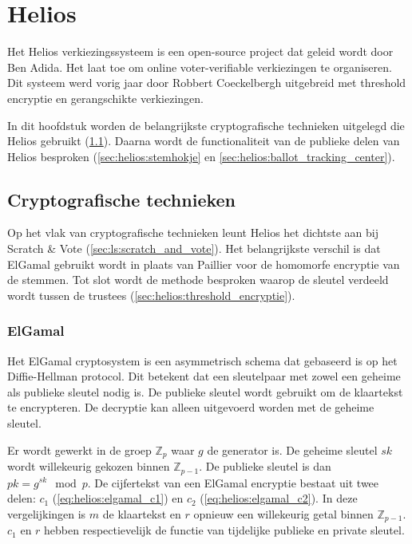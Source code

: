 % 
%

\chapter{Helios}
\label{chap:helios}

Het Helios verkiezingssysteem is een open-source project dat geleid wordt door Ben Adida.\cite{adida_helios} Het laat toe om online voter-verifiable verkiezingen te organiseren. Dit systeem werd vorig jaar door Robbert Coeckelbergh uitgebreid met threshold encryptie en gerangschikte verkiezingen.\cite{coeckelbergh_toepassing_en_uitbreiding_van_het_helios_online_verkiezingssysteem} 

\npar In dit hoofdstuk worden de belangrijkste cryptografische technieken uitgelegd die Helios gebruikt (\ref{sec:helios:cryptografische_technieken}). Daarna wordt de functionaliteit van de publieke delen van Helios besproken (\ref{sec:helios:stemhokje} en \ref{sec:helios:ballot_tracking_center}).

\section{Cryptografische technieken}
\label{sec:helios:cryptografische_technieken}

Op het vlak van cryptografische technieken leunt Helios het dichtste aan bij Scratch \& Vote (\ref{sec:ls:scratch_and_vote}). Het belangrijkste verschil is dat ElGamal gebruikt wordt in plaats van Paillier voor de homomorfe encryptie van de stemmen. Tot slot wordt de methode besproken waarop de sleutel verdeeld wordt tussen de trustees (\ref{sec:helios:threshold_encryptie}).

\subsection{ElGamal~\cite{elgamal_elgamal}}
\label{sec:helios:elgamal}

Het ElGamal cryptosystem is een asymmetrisch schema dat gebaseerd is op het Diffie-Hellman protocol. Dit betekent dat een sleutelpaar met zowel een geheime als publieke sleutel nodig is. De publieke sleutel wordt gebruikt om de klaartekst te encrypteren. De decryptie kan alleen uitgevoerd worden met de geheime sleutel.

\npar Er wordt gewerkt in de groep $\mathbb{Z}_p$ waar $g$ de generator is. De geheime sleutel $sk$ wordt willekeurig gekozen binnen $\mathbb{Z}_{p-1}$. De publieke sleutel is dan ${pk} = g^{sk} \mod{p}$. De cijfertekst van een ElGamal encryptie bestaat uit twee delen: $c_1$ (\ref{eq:helios:elgamal_c1}) en $c_2$ (\ref{eq:helios:elgamal_c2}). In deze vergelijkingen is $m$ de klaartekst en $r$ opnieuw een willekeurig getal binnen $\mathbb{Z}_{p-1}$. $c_1$ en $r$ hebben respectievelijk de functie van tijdelijke publieke en private sleutel.\cite{preneel_cryptography_and_network_security}

